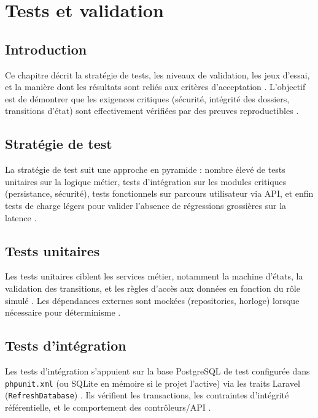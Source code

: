 \chapter{Tests et validation}
\label{chap:tests}

\section{Introduction}

Ce chapitre décrit la stratégie de tests, les niveaux de validation, les jeux d'essai, et la manière dont les résultats sont reliés aux critères d'acceptation \cite{ieee1012,sommerville2016}. L'objectif est de démontrer que les exigences critiques (sécurité, intégrité des dossiers, transitions d'état) sont effectivement vérifiées par des preuves reproductibles \cite{pressman2014,iso25010}.

\section{Stratégie de test}

La stratégie de test suit une approche en pyramide : nombre élevé de tests unitaires sur la logique métier, tests d'intégration sur les modules critiques (persistance, sécurité), tests fonctionnels sur parcours utilisateur via API, et enfin tests de charge légers pour valider l'absence de régressions grossières sur la latence \cite{sommerville2016,ieee1012}.

\section{Tests unitaires}

Les tests unitaires ciblent les services métier, notamment la machine d'états, la validation des transitions, et les règles d'accès aux données en fonction du rôle simulé \cite{sommerville2016}. Les dépendances externes sont mockées (repositories, horloge) lorsque nécessaire pour déterminisme \cite{gamma1994}.

\section{Tests d'intégration}

Les tests d'intégration s'appuient sur la base PostgreSQL de test configurée dans \texttt{phpunit.xml} (ou SQLite en mémoire si le projet l'active) via les traits Laravel (\texttt{RefreshDatabase}) \cite{postgresdoc,laraveldoc}. Ils vérifient les transactions, les contraintes d'intégrité référentielle, et le comportement des contrôleurs/API \cite{date2003}.

